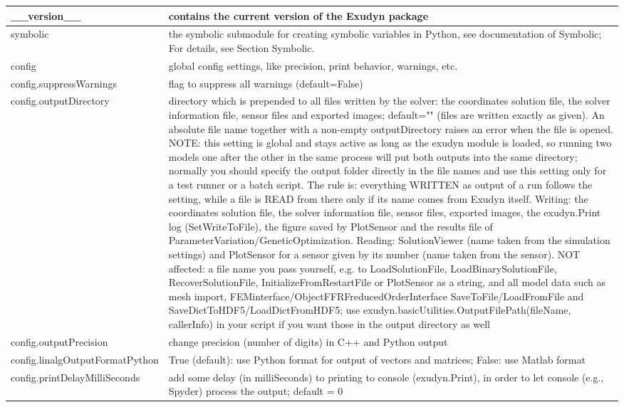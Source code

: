 \begin{center}
\begin{longtable}{| p{8cm} | p{8cm} |}
  \_\_version\_\_ & contains the current version of the Exudyn package\\ \hline  
  symbolic & the symbolic submodule for creating symbolic variables in Python, see documentation of Symbolic; For details, see Section Symbolic.\\ \hline  
  config & global config settings, like precision, print behavior, warnings, etc.\\ \hline  
  config.suppressWarnings & flag to suppress all warnings (default=False)\\ \hline  
  config.outputDirectory & directory which is prepended to all files written by the solver: the coordinates solution file, the solver information file, sensor files and exported images; default="" (files are written exactly as given). An absolute file name together with a non-empty outputDirectory raises an error when the file is opened. NOTE: this setting is global and stays active as long as the exudyn module is loaded, so running two models one after the other in the same process will put both outputs into the same directory; normally you should specify the output folder directly in the file names and use this setting only for a test runner or a batch script. The rule is: everything WRITTEN as output of a run follows the setting, while a file is READ from there only if its name comes from Exudyn itself. Writing: the coordinates solution file, the solver information file, sensor files, exported images, the exudyn.Print log (SetWriteToFile), the figure saved by PlotSensor and the results file of ParameterVariation/GeneticOptimization. Reading: SolutionViewer (name taken from the simulation settings) and PlotSensor for a sensor given by its number (name taken from the sensor). NOT affected: a file name you pass yourself, e.g. to LoadSolutionFile, LoadBinarySolutionFile, RecoverSolutionFile, InitializeFromRestartFile or PlotSensor as a string, and all model data such as mesh import, FEMinterface/ObjectFFRFreducedOrderInterface SaveToFile/LoadFromFile and SaveDictToHDF5/LoadDictFromHDF5; use exudyn.basicUtilities.OutputFilePath(fileName, callerInfo) in your script if you want those in the output directory as well\\ \hline  
  config.outputPrecision & change precision (number of digits) in C++ and Python output\\ \hline  
  config.linalgOutputFormatPython & True (default): use Python format for output of vectors and matrices; False: use Matlab format\\ \hline  
  config.printDelayMilliSeconds & add some delay (in milliSeconds) to printing to console (exudyn.Print), in order to let console (e.g., Spyder) process the output; default = 0\\ \hline  

\end{longtable}
\end{center}

